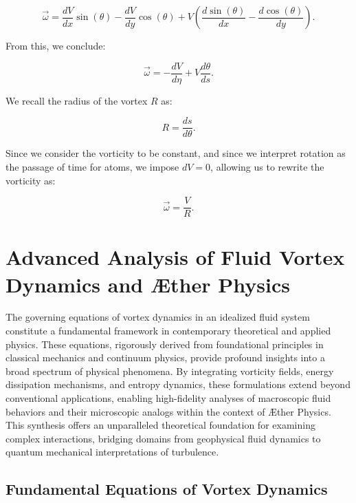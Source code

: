 \documentclass[a4paper,10pt]{article}
\begin{document}
\begin{equation*}
\vec{\omega} = \frac{d V}{d x} \sin (\theta) - \frac{d V}{d y} \cos (\theta) + V\left(\frac{d \sin (\theta)}{d x} - \frac{d \cos (\theta)}{d y}\right).
\end{equation*}


From this, we conclude:


\begin{equation*}
\vec{\omega} = -\frac{d V}{d \eta} + V \frac{d \theta}{d s}.
\end{equation*}


We recall the radius of the vortex $R$ as:


\begin{equation*}
R = \frac{d s}{d \theta}.
\end{equation*}


Since we consider the vorticity to be constant, and since we interpret rotation as the passage of time for atoms, we impose $dV=0$, allowing us to rewrite the vorticity as:


\begin{equation*}
\vec{\omega} = \frac{V}{R}.
\end{equation*}

    

    \section*{Advanced Analysis of Fluid Vortex Dynamics and Æther Physics}

    The governing equations of vortex dynamics in an idealized fluid system constitute a fundamental framework in contemporary theoretical and applied physics. These equations, rigorously derived from foundational principles in classical mechanics and continuum physics, provide profound insights into a broad spectrum of physical phenomena. By integrating vorticity fields, energy dissipation mechanisms, and entropy dynamics, these formulations extend beyond conventional applications, enabling high-fidelity analyses of macroscopic fluid behaviors and their microscopic analogs within the context of Æther Physics. This synthesis offers an unparalleled theoretical foundation for examining complex interactions, bridging domains from geophysical fluid dynamics to quantum mechanical interpretations of turbulence.

    \subsection*{Fundamental Equations of Vortex Dynamics}
\end{document}
